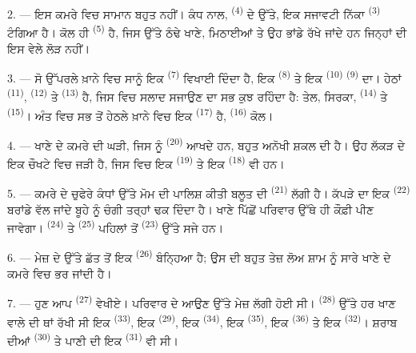 2. --- ਇਸ ਕਮਰੇ ਵਿਚ ਸਾਮਾਨ ਬਹੁਤ ਨਹੀਂ। ਕੰਧ ਨਾਲ, 
\textsuperscript{(4)} ਦੇ ਉੱਤੇ, ਇਕ ਸਜਾਵਟੀ ਨਿੱਕਾ 
\textsuperscript{(3)} ਟੰਗਿਆ ਹੈ। ਕੋਲ ਹੀ  \textsuperscript{(5)}
ਹੈ, ਜਿਸ ਉੱਤੇ ਠੰਢੇ ਖਾਣੇ, ਮਿਠਾਈਆਂ ਤੇ ਉਹ ਭਾਂਡੇ ਰੱਖੇ ਜਾਂਦੇ ਹਨ ਜਿਨ੍ਹਾਂ ਦੀ ਇਸ ਵੇਲੇ
ਲੋੜ ਨਹੀਂ।

3. --- ਸੋ ਉੱਪਰਲੇ ਖ਼ਾਨੇ ਵਿਚ ਸਾਨੂੰ ਇਕ  \textsuperscript{(7)}
ਵਿਖਾਈ ਦਿੰਦਾ ਹੈ, ਇਕ  \textsuperscript{(8)} ਤੇ ਇਕ 
\textsuperscript{(10)}  \textsuperscript{(9)} ਦਾ। ਹੇਠਾਂ 
\textsuperscript{(11)},  \textsuperscript{(12)} ਤੇ
 \textsuperscript{(13)} ਹੈ, ਜਿਸ ਵਿਚ ਸਲਾਦ ਸਜਾਉਣ ਦਾ ਸਭ ਕੁਝ
ਰਹਿੰਦਾ ਹੈ: ਤੇਲ, ਸਿਰਕਾ,  \textsuperscript{(14)} ਤੇ 
\textsuperscript{(15)}। ਅੰਤ ਵਿਚ ਸਭ ਤੋਂ ਹੇਠਲੇ ਖ਼ਾਨੇ ਵਿਚ ਇਕ 
\textsuperscript{(17)} ਹੈ,  \textsuperscript{(16)} ਕੋਲ।

4. --- ਖਾਣੇ ਦੇ ਕਮਰੇ ਦੀ ਘੜੀ, ਜਿਸ ਨੂੰ  \textsuperscript{(20)}
ਆਖਦੇ ਹਨ, ਬਹੁਤ ਅਨੋਖੀ ਸ਼ਕਲ ਦੀ ਹੈ। ਉਹ ਲੱਕੜ ਦੇ ਇਕ ਚੌਖਟੇ ਵਿਚ ਜੜੀ ਹੈ, ਜਿਸ ਵਿਚ ਇਕ
 \textsuperscript{(19)} ਤੇ ਇਕ 
\textsuperscript{(18)} ਵੀ ਹਨ।

\VUsaut{4.6mm}
\VUsaut{3.0mm}

5. --- ਕਮਰੇ ਦੇ ਚੁਫੇਰੇ ਕੰਧਾਂ ਉੱਤੇ ਮੋਮ ਦੀ ਪਾਲਿਸ਼ ਕੀਤੀ ਬਲੂਤ ਦੀ
 \textsuperscript{(21)} ਲੱਗੀ ਹੈ। ਕੱਪੜੇ ਦਾ ਇਕ
 \textsuperscript{(22)} ਬਰਾਂਡੇ ਵੱਲ ਜਾਂਦੇ ਬੂਹੇ ਨੂੰ ਚੰਗੀ
ਤਰ੍ਹਾਂ ਢਕ ਦਿੰਦਾ ਹੈ। ਖਾਣੇ ਪਿੱਛੋਂ ਪਰਿਵਾਰ ਉੱਥੇ ਹੀ ਕੌਫ਼ੀ ਪੀਣ ਜਾਵੇਗਾ।
 \textsuperscript{(24)} ਤੇ  \textsuperscript{(25)}
ਪਹਿਲਾਂ ਤੋਂ  \textsuperscript{(23)} ਉੱਤੇ ਸਜੇ ਹਨ।

6. --- ਮੇਜ਼ ਦੇ ਉੱਤੇ ਛੱਤ ਤੋਂ ਇਕ  \textsuperscript{(26)}
ਬੰਨ੍ਹਿਆ ਹੈ; ਉਸ ਦੀ ਬਹੁਤ ਤੇਜ਼ ਲੋਅ ਸ਼ਾਮ ਨੂੰ ਸਾਰੇ ਖਾਣੇ ਦੇ ਕਮਰੇ ਵਿਚ ਭਰ ਜਾਂਦੀ ਹੈ।

7. --- ਹੁਣ ਆਪ  \textsuperscript{(27)} ਵੇਖੀਏ। ਪਰਿਵਾਰ ਦੇ ਆਉਣ
ਉੱਤੇ ਮੇਜ਼ ਲੱਗੀ ਹੋਈ ਸੀ।  \textsuperscript{(28)} ਉੱਤੇ ਹਰ ਖਾਣ ਵਾਲੇ
ਦੀ ਥਾਂ ਰੱਖੀ ਸੀ ਇਕ  \textsuperscript{(33)}, ਇਕ 
\textsuperscript{(29)}, ਇਕ  \textsuperscript{(34)}, ਇਕ 
\textsuperscript{(35)}, ਇਕ  \textsuperscript{(36)} ਤੇ ਇਕ
 \textsuperscript{(32)}। ਸ਼ਰਾਬ ਦੀਆਂ 
\textsuperscript{(30)} ਤੇ ਪਾਣੀ ਦੀ ਇਕ  \textsuperscript{(31)} ਵੀ ਸੀ।

